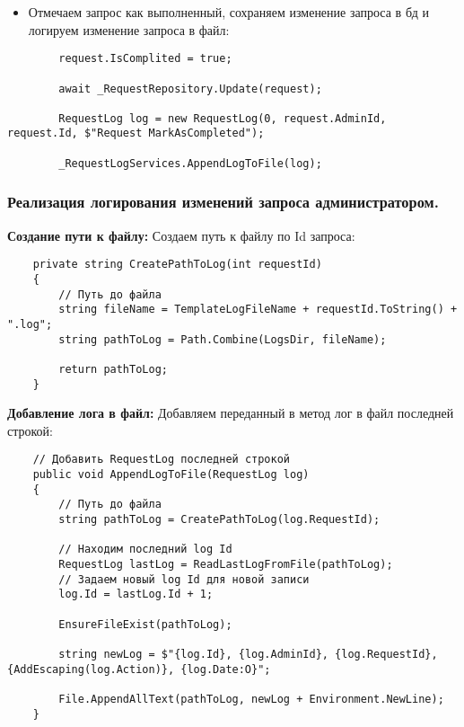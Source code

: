 \begin{itemize}
	\item{Отмечаем запрос как выполненный, сохраняем изменение запроса в бд и логируем изменение запроса в файл:}
\end{itemize}
\begin{verbatim}
        request.IsComplited = true;

        await _RequestRepository.Update(request);

        RequestLog log = new RequestLog(0, request.AdminId, request.Id, $"Request MarkAsCompleted");

        _RequestLogServices.AppendLogToFile(log);
\end{verbatim}

\subsubsection{Реализация логирования изменений запроса администратором.}

%

\textbf{Создание пути к файлу:} Создаем путь к файлу по Id запроса:
\begin{verbatim}
    private string CreatePathToLog(int requestId)
    {
        // Путь до файла
        string fileName = TemplateLogFileName + requestId.ToString() + ".log";
        string pathToLog = Path.Combine(LogsDir, fileName);

        return pathToLog;
    }
\end{verbatim}

\textbf{Добавление лога в файл:} Добавляем переданный в метод лог в файл последней строкой:
\begin{verbatim}
    // Добавить RequestLog последней строкой
    public void AppendLogToFile(RequestLog log)
    {
        // Путь до файла
        string pathToLog = CreatePathToLog(log.RequestId);

        // Находим последний log Id
        RequestLog lastLog = ReadLastLogFromFile(pathToLog);
        // Задаем новый log Id для новой записи
        log.Id = lastLog.Id + 1;

        EnsureFileExist(pathToLog);

        string newLog = $"{log.Id}, {log.AdminId}, {log.RequestId}, {AddEscaping(log.Action)}, {log.Date:O}";

        File.AppendAllText(pathToLog, newLog + Environment.NewLine);
    }
\end{verbatim}

